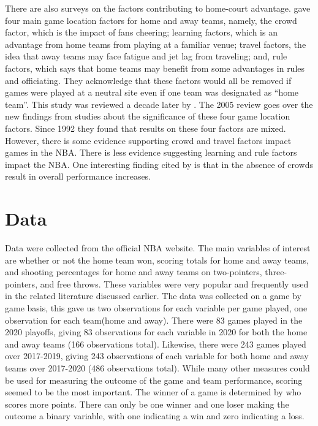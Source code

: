 \documentclass[12pt, letterpaper, titlepage]{article}
\begin{document}
There are also surveys on the factors contributing to home-court advantage.
\citet{Carron1992} gave four main game location factors for home and away
teams, namely, the crowd factor, which is the impact of fans cheering; learning
factors, which is an advantage from home teams from playing at
a familiar venue; travel factors, the idea that away teams may face
fatigue and jet lag from traveling; and, rule factors, which says that home teams
may benefit from some advantages in rules and officiating. They acknowledge that
these factors would all be removed if games were played at a neutral site even
if one team was designated as ``home team''. This study was reviewed a decade later
by \citet{Carron2005}. The 2005 review goes over the new findings from studies
about the significance of these four game location factors. Since 1992 they found
that results on these four factors are mixed. However, there is some evidence
supporting crowd and travel factors impact games in the NBA. There is less
evidence suggesting learning and rule factors impact the NBA. One interesting
finding cited by \citet{Carron2005} is that in the absence of crowds result
in overall performance increases.

\hypertarget{sec:data}{%
\section{Data}\label{sec:data}}

Data were collected from the official NBA website. The main variables of interest
are whether or not the home team won, scoring totals for home and away teams, and
shooting percentages for home and away teams on two-pointers, three-pointers, and
free throws. These variables were very popular and frequently used in the related
literature discussed earlier. The data was collected on a game by game basis, this gave us two observations
for each variable per game played, one observation for each team(home and away).
There were 83 games played in the 2020 playoffs, giving 83 observations
for each variable in 2020 for both the home and away teams (166 observations total).
Likewise, there were 243 games played over 2017-2019, giving 243 observations of each variable
for both home and away teams over 2017-2020 (486 observations total).
While many other measures could be used for measuring
the outcome of the game and team performance, scoring seemed to be the most
important. The winner of a game is determined by who scores more points. There can only be
one winner and one loser making the outcome a binary variable, with
one indicating a win and zero indicating a loss.
\end{document}
